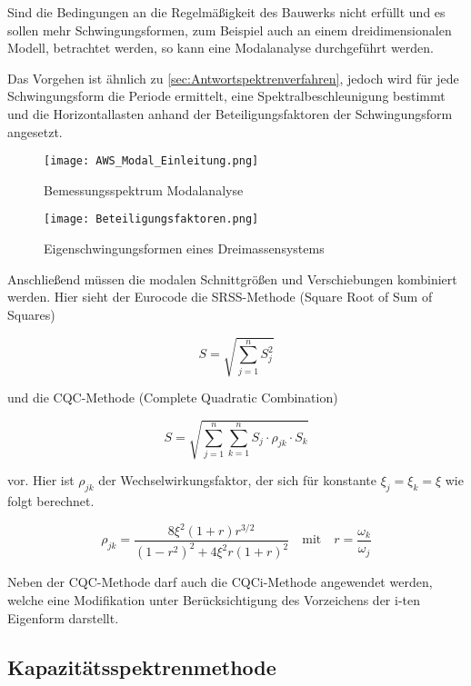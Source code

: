 Sind die Bedingungen an die Regelmäßigkeit des Bauwerks nicht erfüllt und es sollen mehr Schwingungsformen, zum Beispiel auch an einem dreidimensionalen Modell, betrachtet werden, so kann eine Modalanalyse durchgeführt werden.

Das Vorgehen ist ähnlich zu \cref{sec:Antwortspektrenverfahren}, jedoch wird für jede Schwingungsform die Periode ermittelt, eine Spektralbeschleunigung bestimmt und die Horizontallasten anhand der Beteiligungsfaktoren der Schwingungsform angesetzt.

\begin{figure}[H]
    \centering
    \texttt{[image: AWS\_Modal\_Einleitung.png]}
    \caption{Bemessungsspektrum Modalanalyse}
\end{figure}

\begin{figure}[H]
    \centering
    \texttt{[image: Beteiligungsfaktoren.png]}
    \caption{Eigenschwingungsformen eines Dreimassensystems \cite{Pocanschi}}
\end{figure}

Anschließend müssen die modalen Schnittgrößen und Verschiebungen kombiniert werden. Hier sieht der Eurocode die SRSS-Methode (Square Root of Sum of Squares)

\begin{equation*}
S = \sqrt{\sum_{j=1}^{n}S_j^2}
\end{equation*}

und die CQC-Methode (Complete Quadratic Combination)

\begin{equation*}
S = \sqrt{\sum_{j=1}^{n}\sum_{k=1}^{n} S_j \cdot \rho_{jk} \cdot S_k}
\end{equation*}

vor. Hier ist $\rho_{jk}$ der Wechselwirkungsfaktor, der sich für konstante $\xi_j = \xi_k = \xi$ wie folgt berechnet.

\begin{equation*}
\rho_{jk} = \frac{8 \xi^2 (1 + r) r^{3/2}}{(1 - r^2)^2 + 4 \xi^2 r ( 1 + r)^2}
\quad\mathrm{mit}\quad 
r = \frac{\omega_k}{\omega_j}
\end{equation*}

Neben der CQC-Methode darf auch die CQCi-Methode angewendet werden, welche eine Modifikation unter Berücksichtigung des Vorzeichens der i-ten Eigenform darstellt.

\pagebreak

\subsection{Kapazitätsspektrenmethode}
\label{sec:Kapazitaetsspektrenmethode}

